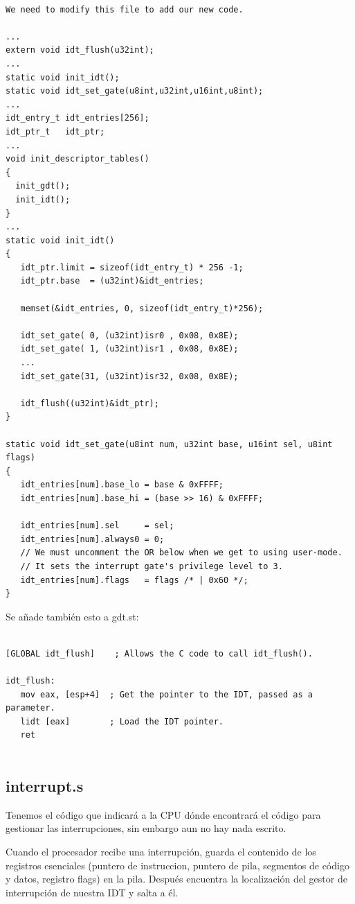 \documentclass{report}
\begin{document}
\begin{lstlisting}

We need to modify this file to add our new code.

...
extern void idt_flush(u32int);
...
static void init_idt();
static void idt_set_gate(u8int,u32int,u16int,u8int);
...
idt_entry_t idt_entries[256];
idt_ptr_t   idt_ptr;
...
void init_descriptor_tables()
{
  init_gdt();
  init_idt();
}
...
static void init_idt()
{
   idt_ptr.limit = sizeof(idt_entry_t) * 256 -1;
   idt_ptr.base  = (u32int)&idt_entries;

   memset(&idt_entries, 0, sizeof(idt_entry_t)*256);

   idt_set_gate( 0, (u32int)isr0 , 0x08, 0x8E);
   idt_set_gate( 1, (u32int)isr1 , 0x08, 0x8E);
   ...
   idt_set_gate(31, (u32int)isr32, 0x08, 0x8E);

   idt_flush((u32int)&idt_ptr);
}

static void idt_set_gate(u8int num, u32int base, u16int sel, u8int flags)
{
   idt_entries[num].base_lo = base & 0xFFFF;
   idt_entries[num].base_hi = (base >> 16) & 0xFFFF;

   idt_entries[num].sel     = sel;
   idt_entries[num].always0 = 0;
   // We must uncomment the OR below when we get to using user-mode.
   // It sets the interrupt gate's privilege level to 3.
   idt_entries[num].flags   = flags /* | 0x60 */;
}
\end{lstlisting}

Se añade también esto a gdt.st:

\begin{lstlisting}

[GLOBAL idt_flush]    ; Allows the C code to call idt_flush().

idt_flush:
   mov eax, [esp+4]  ; Get the pointer to the IDT, passed as a parameter. 
   lidt [eax]        ; Load the IDT pointer.
   ret
   
\end{lstlisting}


\subsection{interrupt.s}

Tenemos el código que indicará a la CPU dónde encontrará el código para gestionar las interrupciones, sin embargo aun no hay nada escrito.

Cuando el procesador recibe una interrupción, guarda el contenido de los registros esenciales (puntero de instruccion, puntero de pila, segmentos de código y datos, registro flags) en la pila. Después encuentra la localización del gestor de interrupción de nuestra IDT y salta a él.
\end{document}
